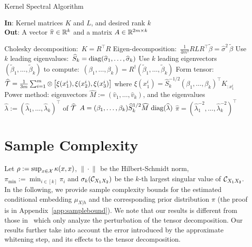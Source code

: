 \documentclass{article}
\begin{document}
\begin{algorithm}[t!]
\caption{Kernel Spectral Algorithm}
 	\textbf{In}: Kernel matrices $K$ and $L$, and desired rank $k$ \\
	\textbf{Out}: A vector $\widehat \pi \in \mathbb{R}^k$ and a matrix $A \in \mathbb{R}^{2m\times k}$\\[-0.4cm]
  \begin{algorithmic}[1]
    \STATE Cholesky decomposition:\ $K=R^\top R$
    \STATE Eigen-decomposition:\ $\frac{1}{4m^2} R L R^\top \widetilde{\beta} = \widehat \sigma^2\,\widetilde{\beta}$
    \STATE Use $k$ leading eigenvalues:\ $\widehat S_k = \mathop{\mathrm{diag}}(\widehat \sigma_1,\ldots,\widehat \sigma_k)$
    \STATE Use $k$ leading eigenvectors $(\widetilde{\beta}_1,\ldots,\widetilde{\beta}_k)$ to
    compute:\ $(\beta_1,\ldots,\beta_k) = R^\dagger (\widetilde{\beta}_1,\ldots,\widetilde{\beta}_k)$
		\STATE Form tensor: $\widehat {{\mathcal{T}}} = \frac{1}{3m}\sum\nolimits_{i=1}^m \otimes\left[\xi(x_1^i), \xi(x_2^i), \xi(x_3^i)\right]$ where $\xi(x_1^i) = \widehat S_k^{-1/2} (\beta_1,\ldots,\beta_k)^\top K_{:x_1^i}$
		\STATE Power method: eigenvectors $\widehat M:=(\widehat v_1,\ldots,\widehat v_k)$, and the eigenvalues $\widehat \lambda := (\widehat\lambda_1,\ldots,\widehat\lambda_k)^\top$ of $\widehat {{\mathcal{T}}}$
		\STATE $A = (\beta_1,\ldots,\beta_k) \widehat  S_k^{1/2} \widehat M \, \mathop{\mathrm{diag}}(\widehat \lambda)$
		\STATE $\widehat \pi = (\widehat\lambda_1^{-2},\ldots,\widehat\lambda_k^{-2})^\top$
  \end{algorithmic}
  \label{alg:multiview}
\end{algorithm}

\vspace{-3mm}
\section{Sample Complexity}
\vspace{-2mm}

Let $\rho:=\sup_{x \in \mathcal{X}} \kappa(x,x)$,   $\| \cdot\|_{}$ be the Hilbert-Schmidt norm, $\pi_{\min}:=\min_{i\in [k]} \pi_i$ and $\sigma_k(\mathcal{C}_{X_1X_2})$ be the $k$-th largest singular value of $\mathcal{C}_{X_1X_2}$. In the following, we provide sample complexity bounds for the estimated conditional embedding $\mu_{X|h}$ and the corresponding prior distribution $\pi$ (the proof is in Appendix~\ref{app:samplebound}). We note that our results is different from those in~\citet{AnandkumarEtal:tensor12} which only analyze the perturbation of the tensor decomposition. Our results further take into account the error introduced by the approximate whitening step, and its effects to the tensor decomposition.
\end{document}
